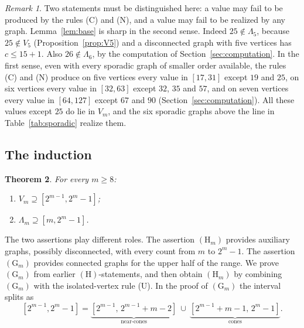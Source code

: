 \documentclass[11pt]{amsart}
\newtheorem{theorem}{Theorem}[section]
\theoremstyle{definition}
\theoremstyle{remark}
\newtheorem{remark}[theorem]{Remark}
\newcommand{\Lam}{\Lambda}
\begin{document}
\begin{remark}\label{rem:sharpbase}
Two statements must be distinguished here: a value may fail to be produced by the rules (C) and (N), and a value may fail to be realized by any graph. Lemma~\ref{lem:base} is sharp in the second sense. Indeed $25\notin\Lam_5$, because $25\notin V_5$ (Proposition~\ref{prop:V5}) and a disconnected graph with five vertices has $c\le15+1$. Also $26\notin\Lam_6$, by the computation of Section~\ref{sec:computation}. In the first sense, even with every sporadic graph of smaller order available, the rules (C) and (N) produce on five vertices every value in $[17,31]$ except $19$ and $25$, on six vertices every value in $[32,63]$ except $32$, $35$ and $57$, and on seven vertices every value in $[64,127]$ except $67$ and $90$ (Section~\ref{sec:computation}). All these values except $25$ do lie in $V_m$, and the six sporadic graphs above the line in Table~\ref{tab:sporadic} realize them.
\end{remark}

\subsection{The induction}

\begin{theorem}\label{thm:dyadic}
For every $m\ge8$:
\begin{enumerate}
\item[$(\mathrm G_m)$] $V_m\supseteq[2^{m-1},2^m-1]$;
\item[$(\mathrm H_m)$] $\Lam_m\supseteq[m,2^m-1]$.
\end{enumerate}
\end{theorem}

The two assertions play different roles. The assertion $(\mathrm H_m)$ provides auxiliary graphs, possibly disconnected, with every count from $m$ to $2^m-1$. The assertion $(\mathrm G_m)$ provides connected graphs for the upper half of the range. We prove $(\mathrm G_m)$ from earlier $(\mathrm H)$-statements, and then obtain $(\mathrm H_m)$ by combining $(\mathrm G_m)$ with the isolated-vertex rule (U). In the proof of $(\mathrm G_m)$ the interval splits as
\[
[2^{m-1},2^m-1]=\underbrace{[2^{m-1},\,2^{m-1}+m-2]}_{\text{near-cones}}\ \cup\ \underbrace{[2^{m-1}+m-1,\,2^m-1]}_{\text{cones}}.
\]
\end{document}
